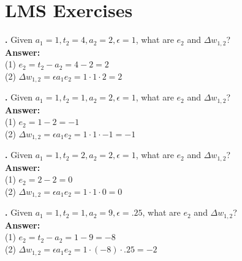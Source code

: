
\section{LMS Exercises}




\noindent
{}
{\bf \theLMSCounter.}  Given $a_1 = 1, t_2 = 4, a_2 = 2, \epsilon = 1$, what are $e_2$ and $\Delta w_{1,2}$? \\
{\bf Answer:}  \\
(1) $e_2 = t_2 - a_2 = 4 - 2  = 2 $ \\
(2) $\Delta w_{1,2} = \epsilon a_1 e_2 = 1 \cdot 1 \cdot  2 = 2$
\bigskip

\noindent
{}
{\bf \theLMSCounter.}  Given $a_1 = 1, t_2 = 1, a_2 = 2, \epsilon = 1$, what are $e_2$ and $\Delta w_{1,2}$? \\
{\bf Answer:}  \\
(1) $e_2 = 1 - 2  = -1 $ \\
(2) $\Delta w_{1,2} = \epsilon a_1 e_2 = 1 \cdot 1 \cdot  -1 = -1$
\bigskip

\noindent
{}
{\bf \theLMSCounter.}  Given $a_1 = 1, t_2 = 2, a_2 = 2, \epsilon = 1$, what are $e_2$ and $\Delta w_{1,2}$? \\
{\bf Answer:}  \\
(1) $e_2 = 2 - 2  = 0 $ \\
(2) $\Delta w_{1,2} = \epsilon a_1 e_2 = 1 \cdot 1 \cdot 0 = 0$
\bigskip

\noindent
{}
{\bf \theLMSCounter.}  Given $a_1 = 1, t_2 = 1, a_2 = 9, \epsilon = .25$, what are $e_2$ and $\Delta w_{1,2}$? \\
{\bf Answer:}  \\
(1) $e_2 = t_2 - a_2 = 1 - 9 = -8 $ \\
(2) $\Delta w_{1,2} = \epsilon a_1 e_2 = 1 \cdot (-8) \cdot  .25 = -2$
\bigskip


